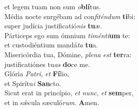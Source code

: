 \oddverse et legem tuam non sum \textit{o}\textbf{blí}tus.\\
\evenverse Média nocte surgébam ad con\textit{fi}\textit{tén}\textit{dum} \textbf{ti}bi:~\*\\
\evenverse super judícia justificatió\textit{nis} \textbf{tu}æ.\\
\oddverse Párticeps ego sum ómnium \textit{ti}\textit{mén}\textit{ti}\textbf{um} te:~\*\\
\oddverse et custodiéntium mandá\textit{ta} \textbf{tu}a.\\
\evenverse Misericórdia tua, Dómine, \textit{ple}\textit{na} \textit{est} \textbf{ter}ra:~\*\\
\evenverse justificatiónes tu\textit{as} \textbf{do}ce me.\\
\oddverse Glória \textit{Pa}\textit{tri}, \textit{et} \textbf{Fí}lio,~\*\\
\oddverse et Spirítu\textit{i} \textbf{San}cto.\\
\evenverse Sicut erat in princípio, \textit{et} \textit{nunc}, \textit{et} \textbf{sem}per,~\*\\
\evenverse et in sǽcula sæculó\textit{rum}. \textbf{A}men.\\

